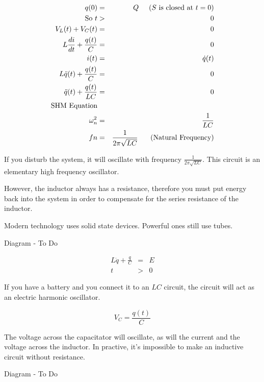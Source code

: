 \documentclass[a4paper,12pt]{article}
\begin{document}
\begin{eqnarray*}
q(0) & = & Q \mbox{\hspace{5mm}($S$ is closed at $t = 0$)} \\
\mbox{So } t & > & 0 \\
V_{L}(t) + V_{C}(t) & = & 0 \\
L \frac{di}{dt} + \frac{q(t)}{C} & = & 0 \\
i(t) & = & \dot{q}(t) \\
L \ddot{q}(t) + \frac{q(t)}{C} & = & 0 \\
\ddot{q}(t) + \frac{q(t)}{LC} & = & 0 \\
\mbox{SHM Equation} & & \\
\omega_{n}^{2} & = & \frac{1}{LC} \\
fn & = & \frac{1}{2 \pi \sqrt{LC}} \mbox{\hspace{5mm} (Natural
Frequency)}
\end{eqnarray*}

If you disturb the system, it will oscillate with frequency $\frac{1}{2
\pi \sqrt{LC}}$. This circuit is an elementary high frequency
oscillator.

However, the inductor always has a resistance, therefore you must put
energy back into the system in order to compensate for the series
resistance of the inductor.

Modern technology uses solid state devices. Powerful ones still use
tubes.


\begin{table}[hbtp]

Diagram - To Do

\end{table}

\begin{eqnarray*}
L \ddot{q} + \frac{q}{C} & = & E \\
t & > & 0 
\end{eqnarray*}

If you have a battery and you connect it to an $LC$ circuit, the circuit
will act as an electric harmonic oscillator.

\[ V_{C} = \frac{q(t)}{C} \]

The voltage across the capacitator will oscillate, as will the current
and the voltage across the inductor. In practive, it's impossible to make
an inductive circuit without resistance.

\begin{table}[hbtp]

Diagram - To Do

\end{table}
\end{document}
